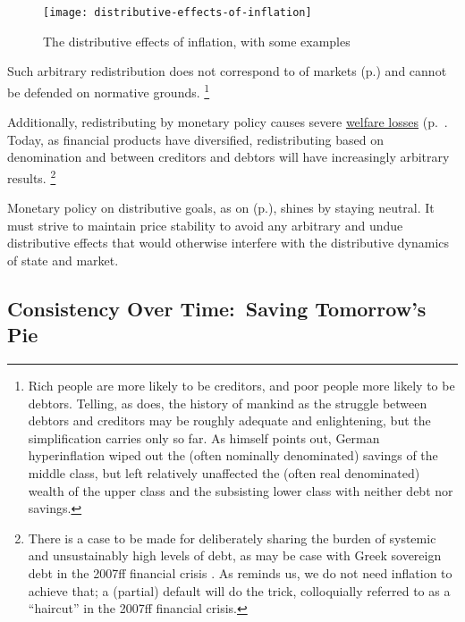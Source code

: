 \begin{figure}[htbp]
	\centering
	\texttt{[image: distributive-effects-of-inflation]}
	\caption[Distributive Effects of Inflation]{The distributive effects of inflation, with some examples}
	\label{fig:distributive-effects-of-inflation}
\end{figure}

Such arbitrary redistribution does not correspond to  of markets  (p.\pageref{sec:inequality-dynamics}) and cannot be defended on normative grounds.
\footnote{
	Rich people are more likely to be creditors, and poor people more likely to be debtors.
	Telling, as \cite{Coggan2011} does, the history of mankind as the struggle between debtors and creditors \citep[paraphrasing][]{Marx-1867-aa} may be roughly adequate and enlightening, but the simplification carries only so far.
	As \cite[K6-24-04]{Coggan2011} himself points out, German hyperinflation wiped out the (often nominally denominated) savings of the middle class, but left relatively unaffected the (often real denominated) wealth of the upper class and the subsisting lower class with neither debt nor savings.
}

Additionally, redistributing by monetary policy causes severe \hyperref[sec:price-stability]{welfare losses} (p.~\pageref{sec:price-stability}.
Today, as financial products have diversified, redistributing based on denomination and between creditors and debtors will have increasingly arbitrary results.
\footnote{
	There is a case to be made for deliberately sharing the burden of systemic and unsustainably high levels of debt, as may be case with Greek sovereign debt in the 2007ff financial crisis \citep{Coggan2011}.
	As \citeauthor{Coggan2011} reminds us, we do not need inflation to achieve that;
	a (partial) default will do the trick, colloquially referred to as a ``haircut'' in the 2007ff financial crisis.
}

Monetary policy on distributive goals, as on  (p.\pageref{sec:production}), shines by staying neutral.
It must strive to maintain price stability to avoid any arbitrary and undue distributive effects that would otherwise interfere with the distributive dynamics of state and market.

\subsection[Consistency Over Time]{Consistency Over Time:~Saving Tomorrow's Pie}\label{sec:time}

